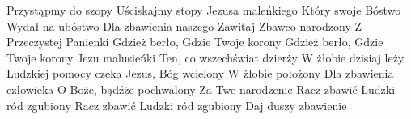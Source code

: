 \beginverse
Przystąpmy do szopy
Uściskajmy stopy
Jezusa maleńkiego
Który swoje Bóstwo
Wydał na ubóstwo
Dla zbawienia naszego
\endverse
\beginchorus
Zawitaj Zbawco narodzony
Z Przeczystej Panienki
Gdzież berło,
Gdzie Twoje korony
Gdzież berło,
Gdzie Twoje korony
Jezu malusieńki
\endchorus
\beginverse
Ten, co wszechświat dzierży
W żłobie dzisiaj leży
Ludzkiej pomocy czeka
Jezus, Bóg wcielony
W żłobie położony
Dla zbawienia człowieka
\endverse
\beginchorus
O Boże, bądźże pochwalony
Za Twe narodzenie
Racz zbawić
Ludzki ród zgubiony
Racz zbawić
Ludzki ród zgubiony
Daj duszy zbawienie
\endchorus
\endsong